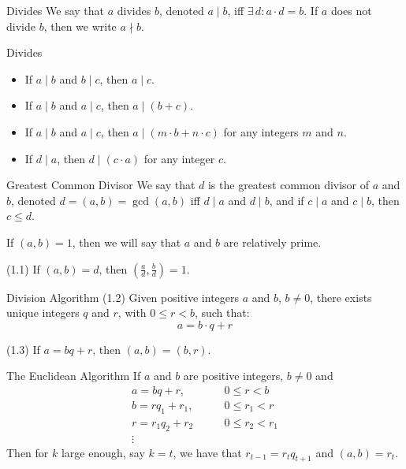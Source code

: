 \documentclass[12pt]{article}
\begin{document}
\begin{definition}{Divides}{}
    We say that $ a $ divides $ b $, denoted $ a \mid b $, iff $ \exists \, d : a \cdot d = b $. If $ a $ does not divide $ b $, then we write $ a \nmid b $.
\end{definition}
\begin{properties}{Divides}{}
    \begin{itemize}
    \item If $ a \mid b $ and $ b \mid c $, then $ a \mid c $.
    \item If $ a \mid b $ and $ a \mid c $, then $ a \mid \left( b + c \right) $.
    \item If $ a \mid b $ and $ a \mid c $, then $ a \mid \left( m \cdot b + n \cdot c \right) $ for any integers $ m $ and $ n $.
    \item If $ d \mid a $, then $ d \mid \left( c \cdot a \right) $ for any integer $ c $.
    \end{itemize}
\end{properties}
\begin{definition}{Greatest Common Divisor}{}
    We say that $ d $ is the greatest common divisor of $ a $ and $ b $, denoted $ d = \left( a, b \right) = \gcd \left( a, b \right) $ iff $ d \mid a $ and $ d \mid b $, and if $ c \mid a $ and $ c \mid b $, then $ c \leq d $.
\end{definition}
\begin{remark}{}{}
    If $ \left( a, b \right) = 1 $, then we will say that $ a $ and $ b $ are relatively prime.
\end{remark}
\begin{theorem}{(1.1)}{}
    If $ \left( a, b \right) = d $, then $ \left( \frac{a}{d}, \frac{b}{d} \right) = 1 $.
\end{theorem}
\begin{theorem}{Division Algorithm (1.2)}{}
    Given positive integers $ a $ and $ b $, $ b \neq 0 $, there exists unique integers $ q $ and $ r $, with $ 0 \leq r < b $, such that:
    \[ a = b \cdot q + r \]
\end{theorem}
\begin{lemma}{(1.3)}{}
    If $ a = bq + r $, then $ \left( a, b \right) = \left( b, r \right) $.
\end{lemma}
\begin{theorem}{The Euclidean Algorithm}{}
    If $ a $ and $ b $ are positive integers, $ b \neq 0 $ and
    \begin{align*}
        a = bq + r, & \qquad 0 \leq r < b \\
        b = r q_1 + r_1, & \qquad 0 \leq r_1 < r \\
        r = r_1 q_2 + r_2 & \qquad 0 \leq r_2 < r_1 \\
        \vdots
    \end{align*}
    Then for $ k $ large enough, say $ k = t $, we have that $ r_{t-1} = r_t q_{t+1} $ and $ \left( a, b \right) = r_t $.
\end{theorem}
\end{document}
